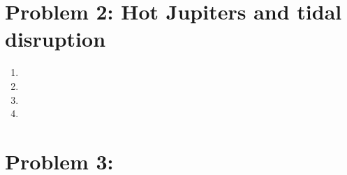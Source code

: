 \documentclass[11pt,letterpaper]{article}
\begin{document}
\section*{Problem 2: Hot Jupiters and tidal disruption}

\begin{enumerate}[label=(\alph*)]

    \item

    
    \item
    
    
    \item
    
    
    \item

    
\end{enumerate}




\section*{Problem 3:}
\begin{enumerate}[label=(\alph*)]
  
    
\end{enumerate}
\end{document}
